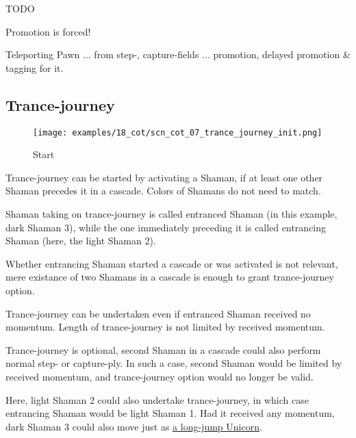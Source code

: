 \huge{TODO}
\normalsize{}

Promotion is forced!

Teleporting Pawn ... from step-, capture-fields ... promotion, delayed promotion \& tagging for it.

\clearpage %

\subsection*{Trance-journey}

\noindent
\begin{wrapfigure}[13]{l}{0.4\textwidth}
\centering
\texttt{[image: examples/18\_cot/scn\_cot\_07\_trance\_journey\_init.png]}
\caption{Start}
\label{fig:scn_cot_07_trance_journey_init}
\end{wrapfigure}
Trance-journey can be started by activating a Shaman, if at least one other
Shaman precedes it in a cascade. Colors of Shamans do not need to match.

Shaman taking on trance-journey is called entranced Shaman (in this example,
dark Shaman 3), while the one immediately preceding it is called entrancing
Shaman (here, the light Shaman 2).

Whether entrancing Shaman started a cascade or was activated is not relevant,
mere existance of two Shamans in a cascade is enough to grant trance-journey
option.

Trance-journey can be undertaken even if entranced Shaman received no momentum.
Length of trance-journey is not limited by received momentum.

Trance-journey is optional, second Shaman in a cascade could also perform normal
step- or capture-ply. In such a case, second Shaman would be limited by received
momentum, and trance-journey option would no longer be valid.

Here, light Shaman 2 could also undertake trance-journey, in which case entrancing
Shaman would be light Shaman 1.
Had it received any momentum, dark Shaman 3 could also move just as
\hyperref[fig:scn_cot_04_dark_shaman_step_ply]{a long-jump Unicorn}.

\clearpage %

